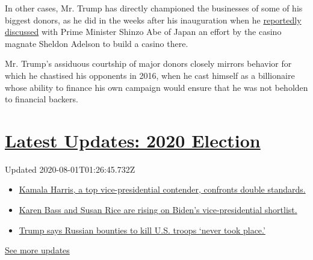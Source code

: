 In other cases, Mr. Trump has directly championed the businesses of some
of his biggest donors, as he did in the weeks after his inauguration
when he
\href{https://features.propublica.org/trump-inc-podcast/sheldon-adelson-casino-magnate-trump-macau-and-japan/}{reportedly
discussed} with Prime Minister Shinzo Abe of Japan an effort by the
casino magnate Sheldon Adelson to build a casino there.

Mr. Trump's assiduous courtship of major donors closely mirrors behavior
for which he chastised his opponents in 2016, when he cast himself as a
billionaire whose ability to finance his own campaign would ensure that
he was not beholden to financial backers.

\hypertarget{latest-updates-2020-election}{%
\section{\texorpdfstring{\href{https://www.nytimes.com/2020/07/31/us/elections/biden-vs-trump.html?action=click\&pgtype=Article\&state=default\&region=MAIN_CONTENT_1\&context=storylines_live_updates}{Latest
Updates: 2020
Election}}{Latest Updates: 2020 Election}}\label{latest-updates-2020-election}}

Updated 2020-08-01T01:26:45.732Z

\begin{itemize}
\tightlist
\item
  \href{https://www.nytimes.com/2020/07/31/us/elections/biden-vs-trump.html?action=click\&pgtype=Article\&state=default\&region=MAIN_CONTENT_1\&context=storylines_live_updates\#link-29fdff45}{Kamala
  Harris, a top vice-presidential contender, confronts double
  standards.}
\item
  \href{https://www.nytimes.com/2020/07/31/us/elections/biden-vs-trump.html?action=click\&pgtype=Article\&state=default\&region=MAIN_CONTENT_1\&context=storylines_live_updates\#link-13ec3d9c}{Karen
  Bass and Susan Rice are rising on Biden's vice-presidential
  shortlist.}
\item
  \href{https://www.nytimes.com/2020/07/31/us/elections/biden-vs-trump.html?action=click\&pgtype=Article\&state=default\&region=MAIN_CONTENT_1\&context=storylines_live_updates\#link-49e9a016}{Trump
  says Russian bounties to kill U.S. troops `never took place.'}
\end{itemize}

\href{https://www.nytimes.com/2020/07/31/us/elections/biden-vs-trump.html?action=click\&pgtype=Article\&state=default\&region=MAIN_CONTENT_1\&context=storylines_live_updates}{See
more updates}

